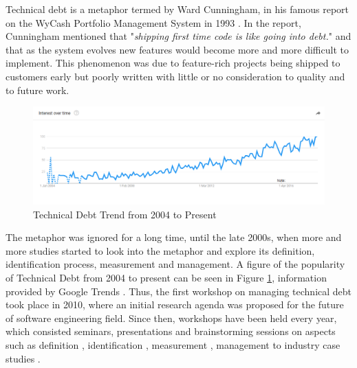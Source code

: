 \documentclass{mprop}
\begin{document}
Technical debt is a metaphor termed by Ward Cunningham, in his famous report on the WyCash Portfolio Management System in 1993 \cite{Cunningham1993}.
In the report, Cunningham mentioned that "\textit{shipping first time code is like going into debt.}" and that as the system evolves new features would become more and more difficult to implement.
This phenomenon was due to feature-rich projects being shipped to customers early but poorly written with little or no consideration to quality and to future work.

\begin{figure}
	\centering
	\includegraphics[width=\linewidth]{visualisations/TD_trend.png}
	\caption{Technical Debt Trend from 2004 to Present}
	\label{fig:td-trend}
\end{figure}

The metaphor was ignored for a long time, until the late 2000s, when more and more studies started to look into the metaphor and explore its definition, identification process, measurement and management.
A figure of the popularity of Technical Debt from 2004 to present can be seen in Figure \ref{fig:td-trend}, information provided by Google Trends \cite{GoogleTrends}.
Thus, the first workshop on managing technical debt took place in 2010, where an initial research agenda was proposed for the future of software engineering field.
Since then, workshops have been held every year, which consisted seminars, presentations and brainstorming sessions on aspects such as
definition \cite{Kruchten2012} \cite{Theodoropoulos2011} \cite{Schmid2013},
identification \cite{Ernst2012},
measurement \cite{Letouzey2012} \cite{Curtis2012} \cite{Nugroho2011} \cite{Zazworka2011} \cite{Fontana2012} \cite{Bohnet2011},
management \cite{Guo2011} \cite{Zazworka2011Prioritise} \cite{Seaman2012} to
industry case studies \cite{Lim2012} \cite{Morgenthaler2012} \cite{Codabux2013} \cite{Holvitie2014} \cite{Klinger2011}.
\end{document}
